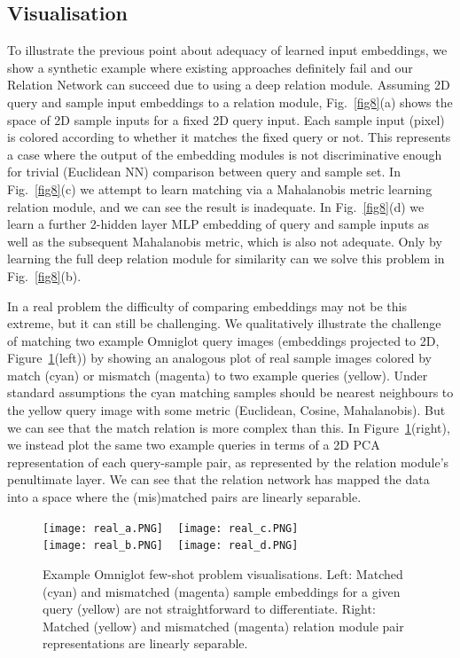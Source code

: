 \documentclass[10pt,twocolumn,letterpaper]{article}
\begin{document}
\subsection{Visualisation}
To illustrate the previous point about adequacy of learned input embeddings, we show a synthetic example where existing approaches definitely fail and our Relation Network can succeed due to using a deep relation module. Assuming 2D query and sample input embeddings to a relation module, Fig.~\ref{fig8}(a) shows the space of 2D sample inputs for a fixed 2D query input. Each sample input (pixel) is colored according to whether it matches the fixed query or not. This represents a case where the output of the embedding modules is not discriminative enough for trivial (Euclidean NN) comparison between query and sample set. In Fig.~\ref{fig8}(c) we attempt to learn matching via a Mahalanobis metric learning relation module, and we can see the result is inadequate. In Fig.~\ref{fig8}(d) we  learn a further 2-hidden layer MLP embedding of query and sample inputs as well as the subsequent Mahalanobis metric, which is also not adequate. Only by learning the full deep relation module for similarity can we solve this problem in Fig.~\ref{fig8}(b).


In a real problem the difficulty of comparing embeddings may not be this extreme, but it can still be challenging. We qualitatively illustrate the challenge of matching two example Omniglot query images (embeddings projected to 2D, Figure~\ref{fig:Embed}(left)) by showing an analogous plot of real sample images colored by match (cyan) or mismatch (magenta) to two example queries (yellow). 
Under standard assumptions \cite{vinyals2016matching, snell2017prototypical,mensink2012metric,chen2012jointBayesian} the cyan matching samples should be nearest neighbours to the yellow query image with some metric (Euclidean, Cosine, Mahalanobis). But we can see that the match relation is more complex than this.  In Figure~\ref{fig:Embed}(right), we instead plot the same two example queries in terms of a 2D PCA representation of each query-sample pair, as represented by the relation module's penultimate layer. We can see that the relation network has mapped the data into a space where the (mis)matched pairs are linearly separable.



\begin{figure}[t] 
\centering
\texttt{[image: real\_a.PNG]} 
~
\texttt{[image: real\_c.PNG]} 
\\
\texttt{[image: real\_b.PNG]} 
~
\texttt{[image: real\_d.PNG]} 
\caption{\small Example Omniglot few-shot problem visualisations. Left: Matched (cyan) and mismatched (magenta) sample embeddings for a given query (yellow) are not straightforward to differentiate. Right: Matched (yellow) and mismatched (magenta) relation module pair representations are linearly separable. }
\label{fig:Embed} 
\end{figure}
\end{document}
